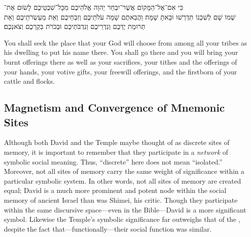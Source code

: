 \begin{hebrewtext}
    כִּי אִם־אֶל־הַמָּקוֹם אֲשֶׁר־יִבְחַר יְהוָה אֱלֹהֵיכֶם מִכָּל־שִׁבְטֵיכֶם לָשׂוּם אֶת־\\שְׁמוֹ שָׁם לְשִׁכְנוֹ תִדְרְשׁוּ וּבָאתָ שָׁמָּה׃
    וַהֲבֵאתֶם שָׁמָּה עֹלֹתֵיכֶם וְזִבְחֵיכֶם וְאֵת מַעְשְׂרֹתֵיכֶם וְאֵת תְּרוּמַת יֶדְכֶם וְנִדְרֵיכֶם וְנִדְבֹתֵיכֶם וּבְכֹרֹת בְּקַרְכֶם וְצֹאנְכֶם׃
\end{hebrewtext}
\begin{translation}
    You shall seek the place that \yahweh your God will choose from among all your tribes as his dwelling to put his name there. You shall go there
    and you will bring your burnt offerings there as well as your sacrifices, your tithes and the offerings of your hands, your votive gifts, your freewill offerings, and the firstborn of your cattle and flocks. 
\end{translation}


\subsection{Magnetism and Convergence of Mnemonic Sites}
Although both David and the Temple maybe thought of as discrete sites of memory, it is important to remember that they participate in a \emph{network} of symbolic social meaning. Thus, ``discrete'' here does not mean ``isolated.'' Moreover, not all sites of memory carry the same weight of significance within a particular symbolic system. In other words, not all sites of memory are created equal; David is a much more prominent and potent node within the social memory of ancient Israel than was Shimei, his critic. Though they participate within the same discursive space---even in the Bible---David is a more significant symbol. Likewise the Temple's symbolic significance far outweighs that of the , despite the fact that---functionally---their social function was similar.

